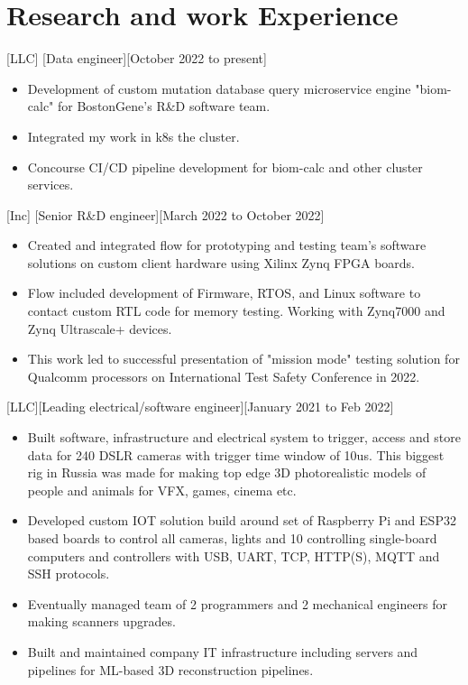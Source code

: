\documentclass{article}
\begin{document}
\section{Research and work Experience}


[LLC]
[Data engineer][October 2022 to present]
   \begin{itemize}
      \item Development of custom mutation database query microservice engine "biom-calc" for BostonGene's R\&D software team.
      \item Integrated my work in k8s the cluster.
      \item Concourse CI/CD pipeline development for biom-calc and other cluster services.
    \end{itemize}

[Inc]
[Senior R\&D engineer][March 2022 to October 2022]
   \begin{itemize}
      \item Created and integrated flow for prototyping and testing team's software solutions on custom client hardware using Xilinx Zynq FPGA boards.
      \item Flow included development of Firmware, RTOS, and Linux software to contact custom RTL code for memory testing. Working with Zynq7000 and Zynq Ultrascale+ devices.
      \item This work led to successful presentation of "mission mode" testing solution for Qualcomm processors on International Test Safety Conference in 2022.
   \end{itemize}  

[LLC][Leading electrical/software engineer][January 2021 to Feb 2022]
\begin{itemize}
   \item Built software, infrastructure and electrical system to trigger, access and store data for 240 DSLR cameras with trigger time window of 10us. This biggest rig in Russia was made for making top edge 3D photorealistic models of people and animals for VFX, games, cinema etc.
   \item Developed custom IOT solution build around set of Raspberry Pi and ESP32 based boards to control all cameras, lights and 10 controlling single-board computers and controllers with USB, UART, TCP, HTTP(S), MQTT and SSH protocols.
   \item Eventually managed team of 2 programmers and 2 mechanical engineers for making scanners upgrades.
   \item  Built and maintained company IT infrastructure including servers and pipelines for ML-based 3D reconstruction pipelines.
\end{itemize}
\end{document}
